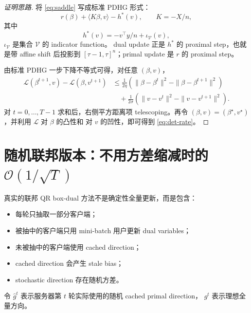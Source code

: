 \documentclass[UTF8,a4paper,11pt]{ctexart}
\begin{document}
\begin{proof}[证明思路]
将 \eqref{eq:saddle} 写成标准 PDHG 形式：
\[
    r(\beta)+\langle K\beta,v\rangle-h^\ast(v),
    \qquad
    K=-X/n,
\]
其中
\[
    h^\ast(v)
    =
    -v^\top y/n+\iota_{\mathcal{V}}(v),
\]
$\iota_{\mathcal{V}}$ 是集合 $\mathcal{V}$ 的 indicator function。
dual update 正是 $h^\ast$ 的 proximal step，也就是带 affine shift 后投影到
$[\tau-1,\tau]^n$；primal update 是 $r$ 的 proximal step。

由标准 PDHG 一步下降不等式可得，对任意 $(\beta,v)$，
\begin{align}
    \mathcal{L}(\beta^{t+1},v)
    -
    \mathcal{L}(\beta,v^{t+1})
    &\le
    \frac{1}{2\eta}
    \left(
        \|\beta-\beta^t\|^2
        -
        \|\beta-\beta^{t+1}\|^2
    \right)
    \nonumber\\
    &\quad+
    \frac{1}{2\sigma}
    \left(
        \|v-v^t\|^2
        -
        \|v-v^{t+1}\|^2
    \right).
    \label{eq:one-step}
\end{align}
对 $t=0,\ldots,T-1$ 求和后，右侧平方距离项 telescoping。再令
$(\beta,v)=(\beta^\star,v^\star)$，并利用 $\mathcal{L}$ 对 $\beta$ 的凸性和
对 $v$ 的凹性，即可得到 \eqref{eq:det-rate}。
\end{proof}

\section{随机联邦版本：不用方差缩减时的 $\mathcal{O}(1/\sqrt{T})$}

真实的联邦 QR box-dual 方法不是确定性全量更新，而是包含：

\begin{itemize}[leftmargin=2em]
    \item 每轮只抽取一部分客户端；
    \item 被抽中的客户端只用 mini-batch 用户更新 dual variables；
    \item 未被抽中的客户端使用 cached direction；
    \item cached direction 会产生 stale bias；
    \item stochastic direction 存在随机方差。
\end{itemize}

令 $\widehat{g}^t$ 表示服务器第 $t$ 轮实际使用的随机 cached primal direction，
$g^t$ 表示理想全量方向。
\end{document}

